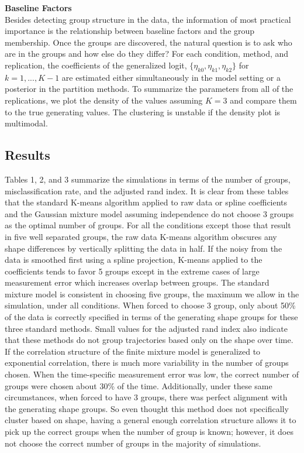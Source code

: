 \documentclass[12pt]{article}
\begin{document}
\textbf{Baseline Factors}\\
Besides detecting group structure in the data, the information of most practical importance is the relationship between baseline factors and the group membership. Once the groups are discovered, the natural question is to ask who are in the groups and how else do they differ? For each condition, method, and replication, the coefficients of the generalized logit, $\{\eta_{k0},\eta_{k1},\eta_{k2}\}$ for $k=1,...,K-1$ are estimated either simultaneously in the model setting or a posterior in the partition methods. To summarize the parameters from all of the replications, we plot the density of the values assuming $K=3$ and compare them to the true generating values. The clustering is unstable if the density plot is multimodal.

\subsection{Results}
Tables 1, 2, and 3 summarize the simulations in terms of the number of groups, misclassification rate, and the adjusted rand index. It is clear from these tables that the standard K-means algorithm applied to raw data or spline coefficients and the Gaussian mixture model assuming independence do not choose 3 groups as the optimal number of groups. For all the conditions except those that result in five well separated groups, the raw data K-means algorithm obscures any shape differences by vertically splitting the data in half. If the noisy from the data is smoothed first using a spline projection, K-means applied to the coefficients tends to favor 5 groups except in the extreme cases of large measurement error which increases overlap between groups. The standard mixture model is consistent in choosing five groups, the maximum we allow in the simulation, under all conditions. When forced to choose 3 group, only about 50\% of the data is correctly specified in terms of the generating shape groups for these three standard methods. Small values for the adjusted rand index also indicate that these methods do not group trajectories based only on the shape over time. \\
If the correlation structure of the finite mixture model is generalized to exponential correlation, there is much more variability in the number of groups chosen. When the time-specific measurement error was low, the correct number of groups were chosen about 30\% of the time. Additionally, under these same circumstances, when forced to have 3 groups, there was perfect alignment with the generating shape groups. So even thought this method does not specifically cluster based on shape, having a general enough correlation structure allows it to pick up the correct groups when the number of group is known; however, it does not choose the correct number of groups in the majority of simulations. \\
\end{document}
